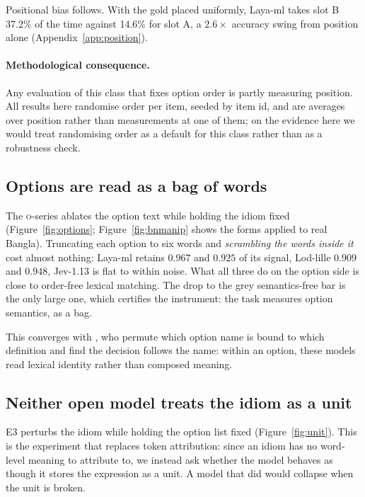\documentclass[11pt]{article}
\begin{document}
Positional bias follows. With the gold placed uniformly, Laya-ml takes slot B
37.2\% of the time against 14.6\% for slot A, a $2.6\times$ accuracy swing from
position alone (Appendix~\ref{app:position}).

\paragraph{Methodological consequence.} Any evaluation of this class that fixes
option order is partly measuring position. All results here randomise order per
item, seeded by item id, and are averages over position rather than measurements
at one of them; on the evidence here we would treat randomising order as a
default for this class rather than as a robustness check.

\subsection{Options are read as a bag of words}
\label{sec:bagofwords}

The \textsc{o}-series ablates the option text while holding the idiom fixed
(Figure~\ref{fig:options}; Figure~\ref{fig:bnmanip} shows the forms applied to
real Bangla). Truncating each option to six words and \emph{scrambling the words
inside it} cost almost nothing: Laya-ml retains $0.967$ and $0.925$ of its
signal, Lod-lille $0.909$ and $0.948$, Jev-1.13 is flat to within noise. What
all three do on the option side is close to order-free lexical matching. The
drop to the grey semantics-free bar is the only large one, which certifies the
instrument: the task measures option semantics, as a bag.

This converges with \citet{sun2026typesafe}, who permute which option name is
bound to which definition and find the decision follows the name: within an
option, these models read lexical identity rather than composed meaning.


\subsection{Neither open model treats the idiom as a unit}
\label{sec:unit}

E3 perturbs the idiom while holding the option list fixed
(Figure~\ref{fig:unit}). This is the experiment that replaces token attribution:
since an idiom has no word-level meaning to attribute to, we instead ask whether
the model behaves as though it stores the expression as a unit. A model that did
would collapse when the unit is broken.
\end{document}

